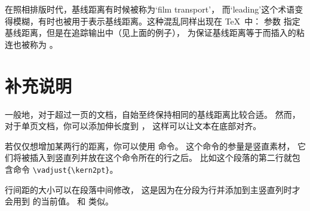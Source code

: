 \documentclass{book}
\begin{document}
在照相排版时代，基线距离有时候被称为`film transport'，
而`leading'这个术语变得模糊，有时也被用于表示基线距离。这种混乱同样出现在 \TeX\ 中：
参数  指定基线距离，但是在追踪输出中（见上面的例子），
为保证基线距离等于而插入的粘连也被称为 。

\section{补充说明}

一般地，对于超过一页的文档，自始至终保持相同的基线距离比较合适。
然而，对于单页文档，你可以添加伸长度到 ，
这样可以让文本在底部对齐。

若仅仅想增加某两行的距离，你可以使用  命令。
这个命令的参量是竖直素材，\vadjust{\kern2pt}%
它们将被插入到竖直列并放在这个命令所在的行之后。
比如这个段落的第二行就包含命令 \verb-\vadjust{\kern2pt}-。

行间距的大小可以在段落中间修改，
这是因为在分段为行并添加到主竖直列时才会用到  的当前值。
 和  类似。
\end{document}
